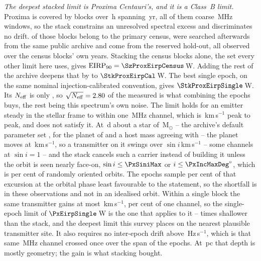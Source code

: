 \emph{The deepest stacked limit is Proxima Centauri's, and it is a Class~B
limit.} Proxima is covered by \StkProxN{} blocks over \StkProxHours\,h
spanning \StkProxSpanYr\,yr, all of them coarse \ChanBModeMHz\,MHz windows,
so the stack constrains an unresolved spectral excess and discriminates no
drift. \SxProxEbCensus{} of those blocks belong to the primary census,
\SzProxEbSearched{} were searched afterwards from the same public archive and
\SzProxEbHold{} come from the reserved hold-out, all observed over the census
blocks' own years. Stacking the census blocks alone, the set every other limit here uses,
gives $\mathrm{EIRP}_{90}=\SzProxEirpCensus$\,W. Adding the rest of the
archive deepens that by \SzProxDeepen{} to $\StkProxEirpCal$\,W. The best
single epoch, on the same nominal injection-calibrated convention, gives
$\StkProxEirpSingle$\,W. Its $N_{\rm eff}$ is only \StkProxNeff, so
$\sqrt{N_{\rm eff}}=2.80$ of the measured \StkProxGain{} is what
combining the epochs buys, the rest being this spectrum's own noise.
The limit holds for an emitter steady in the stellar frame to within one
\ChanBModeMHz\,MHz channel, which is \StkProxTolKms\,km\,s$^{-1}$ peak to
peak, and \PxPlanet{} does not satisfy it. At \PxPorbD\,d about a star of
\PxMassMsun\,M$_\odot$ -- the archive's default parameter set
\citep{NEA2013}, for the planet of \citet{AngladaEscude2016} and a host mass
agreeing with \citet{Kervella2017} -- the planet moves at
\PxVorbKms\,km\,s$^{-1}$, so a
transmitter on it swings over \PxPPKms$\sin i$\,km\,s$^{-1}$ -- some
\PxNChanWalk{} channels at $\sin i=1$ -- and the stack cancels such a
carrier instead of building it unless the orbit is seen nearly face-on,
$\sin i\le\PxSiniMax$ or $i\le\PxIncMaxDeg^\circ$, which is \PxIsoPct{} per
cent of randomly oriented orbits. The \PxNEpoch{} epochs sample
\PxFracSampled{} per cent of that excursion at the orbital phase least
favourable to the statement, so the shortfall is in these observations and
not in an idealised orbit. Within a single block the same transmitter gains
at most \PxBlockDvKms\,km\,s$^{-1}$, \PxBlockPct{} per cent of one channel,
so the single-epoch limit of $\PxEirpSingle$\,W is the one that applies to
it -- \PxEirpRatio{} times shallower than the stack, and the deepest limit
this survey places on the nearest plausible transmitter site. It also
requires no inter-epoch drift above
\StkProxDriftHzS\,Hz\,s$^{-1}$, which is that same \ChanBModeMHz\,MHz channel
crossed once over the span of the epochs. At \StkProxDistPc\,pc that depth is mostly
geometry; the gain is what stacking bought.

